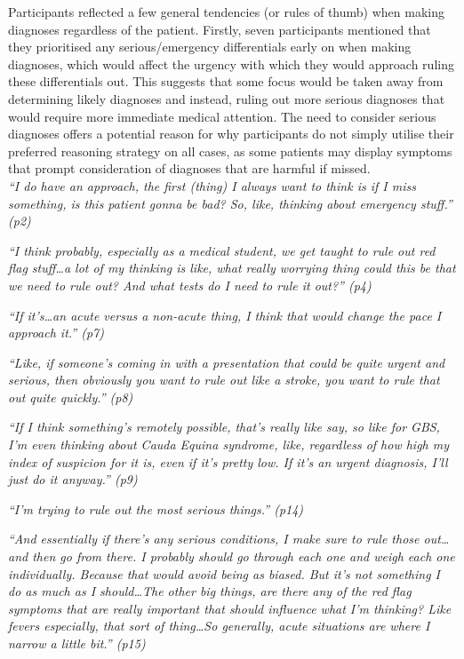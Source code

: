 \documentclass[a4paper, nobind]{templates/ociamthesis}
\begin{document}
Participants reflected a few general tendencies (or rules of thumb) when making diagnoses regardless of the patient. Firstly, seven participants mentioned that they prioritised any serious/emergency differentials early on when making diagnoses, which would affect the urgency with which they would approach ruling these differentials out. This suggests that some focus would be taken away from determining likely diagnoses and instead, ruling out more serious diagnoses that would require more immediate medical attention. The need to consider serious diagnoses offers a potential reason for why participants do not simply utilise their preferred reasoning strategy on all cases, as some patients may display symptoms that prompt consideration of diagnoses that are harmful if missed.\\

\emph{``I do have an approach, the first (thing) I always want to think is if I miss something, is this patient gonna be bad? So, like, thinking about emergency stuff.'' (p2)}

\emph{``I think probably, especially as a medical student, we get taught to rule out red flag stuff\ldots a lot of my thinking is like, what really worrying thing could this be that we need to rule out? And what tests do I need to rule it out?'' (p4)}

\emph{``If it's\ldots an acute versus a non-acute thing, I think that would change the pace I approach it.'' (p7)}

\emph{``Like, if someone's coming in with a presentation that could be quite urgent and serious, then obviously you want to rule out like a stroke, you want to rule that out quite quickly.'' (p8)}

\emph{``If I think something's remotely possible, that's really like say, so like for GBS, I'm even thinking about Cauda Equina syndrome, like, regardless of how high my index of suspicion for it is, even if it's pretty low. If it's an urgent diagnosis, I'll just do it anyway.'' (p9)}

\emph{``I'm trying to rule out the most serious things.'' (p14)}

\emph{``And essentially if there's any serious conditions, I make sure to rule those out\ldots and then go from there. I probably should go through each one and weigh each one individually. Because that would avoid being as biased. But it's not something I do as much as I should\ldots The other big things, are there any of the red flag symptoms that are really important that should influence what I'm thinking? Like fevers especially, that sort of thing\ldots So generally, acute situations are where I narrow a little bit.'' (p15)}
\end{document}
